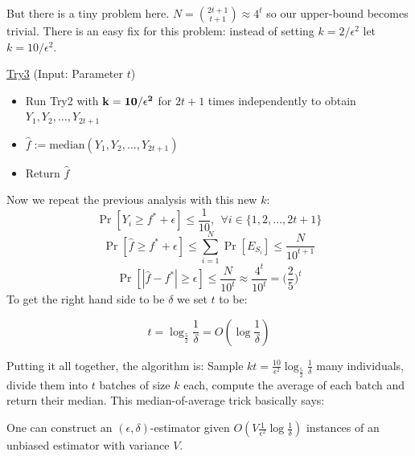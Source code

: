 \documentclass[11pt]{article}
\newcommand{\hf}{\hat{f}}
\begin{document}
But there is a tiny problem here. $N = \binom{2t+1}{t+1} \approx 4^t$ so our upper-bound becomes trivial. There is an easy fix for this problem: instead of setting $k = 2/\epsilon^2$ let $k = 10/\epsilon^2$.
 \begin{mdframed}[backgroundcolor=blue!05,topline=false,bottomline=false,leftline=false,rightline=false] 
	\underline{\sc Try3}
	(Input: Parameter $t$)
	\begin{itemize}
		\item Run Try2 with $\bf k = 10/\epsilon^2$ for $2t+1$ times independently to obtain $Y_1,Y_2,\dots,Y_{2t+1}$
		\item $ \hf := \text{median}(Y_1,Y_2,\dots,Y_{2t+1})$
		\item Return $\hf$
	\end{itemize}
\end{mdframed}
Now we repeat the previous analysis with this new $k$:
\begin{equation*}
    \Pr[Y_i \geq f^* + \epsilon] \leq \frac{1}{10}, \ \ \forall i\in\{1,2,\dots,2t+1\}
\end{equation*}
\begin{equation*}
    \Pr[\hf \geq f^* + \epsilon]
    \leq \sum\limits_{i=1}^N \Pr[E_{S_i}] \leq \frac{N}{10^{t+1}}
\end{equation*}
\begin{equation*}
    \Pr[|\hf - f^*| \geq \epsilon] \leq \frac{N}{10^t} \approx \frac{4^t}{10^t} = \Big(\frac{2}{5}\Big)^t
\end{equation*}
To get the right hand side to be $\delta$ we set $t$ to be:
\begin{mdframed}[backgroundcolor=yellow!10,topline=false,bottomline=false,leftline=false,rightline=false] 
\begin{equation*}
    t = \log_{\frac{5}{2}}{\frac{1}{\delta}} = O(\log{\frac{1}{\delta}})
\end{equation*}
\end{mdframed}
Putting it all together, the algorithm is: Sample $kt = \frac{10}{\epsilon^2}\log_{\frac{5}{2}}{\frac{1}{\delta}}$ many individuals, divide them into $t$ batches of size $k$ each, compute the average of each batch and return their median.
This median-of-average trick basically says:
\begin{mdframed}[backgroundcolor=yellow!10,topline=false,bottomline=false,leftline=false,rightline=false] 
One can construct an $(\epsilon,\delta)$-estimator given $O(V\frac{1}{\epsilon^2}\log{\frac{1}{\delta}})$ instances of an unbiased estimator with variance $V$.
\end{mdframed}
\end{document}
